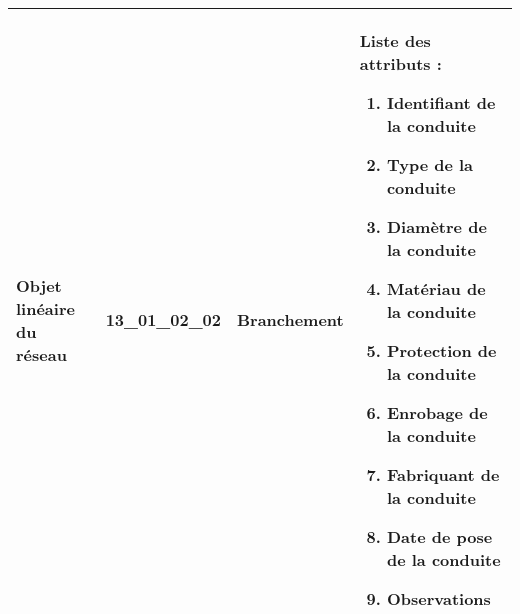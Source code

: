 \documentclass[12pt,titlepage]{book}
\begin{document}
\renewcommand{\arraystretch}{1.2}
\begin{supertabular}{|p{10cm}|c|p{13cm}|p{12cm}|}
 Objet linéaire du réseau & 13\_01\_02\_02 & Branchement & Liste des attributs :
\begin{enumerate}
  \item Identifiant de la conduite  \item Type de la conduite  \item Diamètre de la conduite  \item Matériau de la conduite  \item Protection de la conduite  \item Enrobage de la conduite  \item Fabriquant de la conduite  \item Date de pose de la conduite  \item Observations\end{enumerate}
\\
\hline
\end{supertabular}
\end{document}
